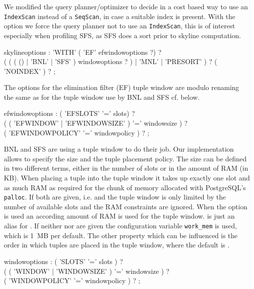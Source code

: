 We modified the query planner/optimizer to decide in a cost based way to use
an \texttt{IndexScan} instead of a \texttt{SeqScan}, in case a suitable
index is present.  With the  option we force the
query planner not to use an \texttt{IndexScan}, this is of
interest especially when profiling SFS, as SFS does a sort prior to skyline
computation.

\begin{rail}
skylineoptions : 
    'WITH' 
    ( 'EF' efwindowoptions ?) ? \\
    ( ( ( () | 'BNL' | 'SFS' ) windowoptions ? ) | 'MNL' | 'PRESORT' ) ? 
    ( 'NOINDEX' ) ? ;
\end{rail}

The options for the elimination filter (EF) tuple window
 are modulo renaming the same as for the tuple window
use by BNL and SFS cf.  below.

\begin{rail}
efwindowoptions : 
    ( 'EFSLOTS' '=' slots) ? \\
    ( ( 'EFWINDOW' | 'EFWINDOWSIZE' ) '=' windowsize ) ? \\
    ( 'EFWINDOWPOLICY' '=' windowpolicy ) ? ;
\end{rail}

BNL and SFS are using a tuple window to do their job. Our
implementation allows to specify the size and the tuple placement
policy. The size can be defined in two different terms, either
in the number of slots or in the amount of RAM (in KB). When placing
a tuple into the tuple window it takes up exactly one slot and
as much RAM as required for the chunk of memory allocated with PostgreSQL's
\texttt{palloc}. If both are given, i.e.  and 
the tuple window is only limited by the number of available slots and
the RAM constraints are ignored. When the 
option is used an according amount of RAM is used for the tuple window.
 is just an alias for .  If
neither  nor  are given the
configuration variable \texttt{work\_mem} is used, which is 1~MB per
default. The other property which can be influenced is the order in which
tuples are placed in the tuple window, where the default is .

\begin{rail}
windowoptions : 
    ( 'SLOTS' '=' slots ) ? \\
    ( ( 'WINDOW' | 'WINDOWSIZE' ) '=' windowsize ) ? \\ 
    ( 'WINDOWPOLICY' '=' windowpolicy ) ? ;
\end{rail}

